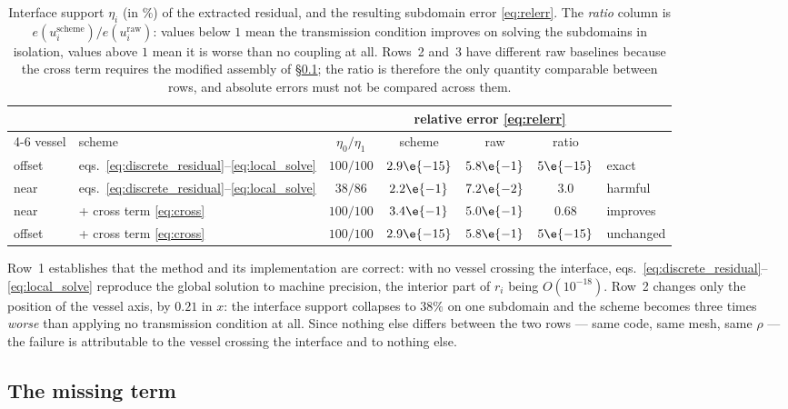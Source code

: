 \begin{table}[htbp]
\centering
\begin{tabular}{llccccl}
\toprule
& & & \multicolumn{3}{c}{relative error \eqref{eq:relerr}} & \\
\cmidrule(lr){4-6}
vessel & scheme & $\eta_0 / \eta_1$
       & scheme & raw & ratio & \\
\midrule
\textsf{offset} & eqs.~\eqref{eq:discrete_residual}--\eqref{eq:local_solve}
  & $100 / 100$ & $2.9\e{-15}$ & $5.8\e{-1}$ & $5\e{-15}$ & exact \\
\textsf{near}   & eqs.~\eqref{eq:discrete_residual}--\eqref{eq:local_solve}
  & $38 / 86$   & $2.2\e{-1}$  & $7.2\e{-2}$ & $3.0$      & harmful \\
\textsf{near}   & \;+ cross term \eqref{eq:cross}
  & $100 / 100$ & $3.4\e{-1}$  & $5.0\e{-1}$ & $0.68$     & improves \\
\textsf{offset} & \;+ cross term \eqref{eq:cross}
  & $100 / 100$ & $2.9\e{-15}$ & $5.8\e{-1}$ & $5\e{-15}$ & unchanged \\
\bottomrule
\end{tabular}
\caption{Interface support $\eta_i$ (in \%) of the extracted residual, and the
resulting subdomain error \eqref{eq:relerr}. The \emph{ratio} column is
$e(u_i^{\mathrm{scheme}})/e(u_i^{\mathrm{raw}})$: values below $1$ mean the
transmission condition improves on solving the subdomains in isolation, values
above $1$ mean it is worse than no coupling at all. Rows~2 and~3 have different
raw baselines because the cross term requires the modified assembly of
\S\ref{sec:cross}; the ratio is therefore the only quantity comparable between
rows, and absolute errors must not be compared across them.}
\label{tab:results}
\end{table}

Row~1 establishes that the method and its implementation are correct: with no
vessel crossing the interface, eqs.~\eqref{eq:discrete_residual}--\eqref{eq:local_solve}
reproduce the global solution to machine precision, the interior part of $r_i$
being $O(10^{-18})$. Row~2 changes only the position of the vessel axis, by
$0.21$ in $x$: the interface support collapses to $38\%$ on one subdomain and
the scheme becomes three times \emph{worse} than applying no transmission
condition at all. Since nothing else differs between the two rows --- same
code, same mesh, same $\rho$ --- the failure is attributable to the vessel
crossing the interface and to nothing else.

\subsection{The missing term}
\label{sec:cross}

